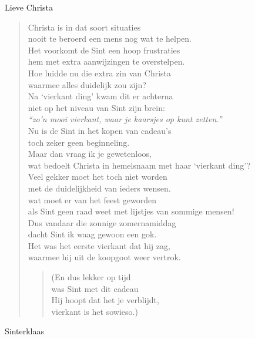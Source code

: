 \documentclass[12pt]{brief}
\begin{document}
\begin{letter}{Lieve Christa}
\begin{verse}
Christa is in dat soort situaties\\
nooit te beroerd een mens nog wat te helpen.\\
Het voorkomt de Sint een hoop frustraties\\
hem met extra aanwijzingen te overstelpen.\\[1.5em]

Hoe luidde nu die extra zin van Christa\\
waarmee alles duidelijk zou zijn?\\
Na `vierkant ding' kwam dit er achterna\\
niet op het niveau van Sint zijn brein:\\[1.5em]

\emph{``zo'n mooi vierkant, waar je kaarsjes op kunt zetten.''}\\[1.5em]

Nu is de Sint in het kopen van cadeau's\\
toch zeker geen beginneling.\\
Maar dan vraag ik je gewetenloos,\\
wat bedoelt Christa in hemelsnaam met haar `vierkant ding'?\\[1.5em]

Veel gekker moet het toch niet worden\\
met de duidelijkheid van ieders wensen.\\
wat moet er van het feest geworden\\
als Sint geen raad weet met lijstjes van sommige mensen!\\[1.5em]

Dus vandaar die zonnige zomernamiddag\\
dacht Sint ik waag gewoon een gok.\\
Het was het eerste vierkant dat hij zag,\\
waarmee hij uit de koopgoot weer vertrok.\\[8em]

\begin{quote}(En dus lekker op tijd\\
was Sint met dit cadeau\\
Hij hoopt dat het je verblijdt,\\
vierkant is het sowieso.)\\[2em]\end{quote}

\end{verse}


Sinterklaas


\closing{}

\end{letter}
\end{document}
